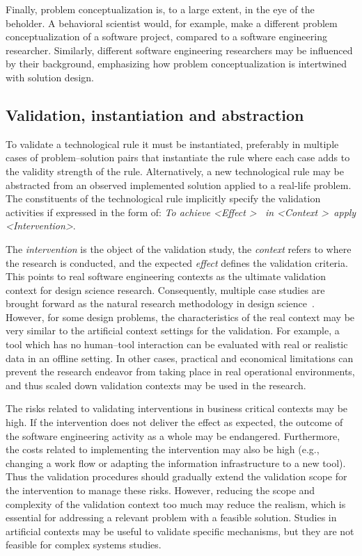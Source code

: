 \documentclass[graybox]{svmult}
\begin{document}
Finally, problem conceptualization is, to a large extent, in the eye of the beholder. A behavioral scientist would, for example, make a different problem conceptualization of a software project, compared to a software engineering researcher. Similarly, different software engineering researchers may be influenced by their background, emphasizing how problem conceptualization is intertwined with solution design.

 

\subsection{Validation, instantiation and abstraction}

To validate a technological rule it must be instantiated, preferably in multiple cases of problem--solution pairs that instantiate the rule where each case adds to the validity strength of the rule. Alternatively, a new technological rule may be abstracted from an observed implemented solution applied to a real-life problem.
The constituents of the technological rule implicitly specify the validation activities if expressed in the form of:
{\emph{To achieve \textless Effect \textgreater ~ in \textless Context \textgreater~apply \textless Intervention\textgreater}.} 

The \emph{intervention} is the object of the validation study, the \emph{context}  refers to where the research is conducted, and the expected \emph{effect} defines the validation criteria. This points to real software engineering contexts as the ultimate validation context for design science research. 
Consequently, multiple case studies are brought forward as the natural research methodology in design science~\citep{van_aken_management_2004}. However, for some design problems, the characteristics of the real context may be very similar to the artificial context settings for the validation. For example, a tool which has no human--tool interaction can be evaluated with real or realistic data in an offline setting. In other cases, practical and economical limitations can prevent the research endeavor from taking place in real operational environments, and thus scaled down validation contexts may be used in the research. 

The risks related to validating interventions in business critical contexts may be high. If the intervention does not deliver the effect as expected, the outcome of the software engineering activity as a whole may be endangered. Furthermore, the costs related to implementing the intervention may also be high (e.g., changing a work flow or adapting the information infrastructure to a new tool). Thus the validation procedures should gradually extend the validation scope for the intervention to manage these risks.
However, reducing the scope and complexity of the validation context too much may reduce the realism, which is essential for addressing a relevant problem with a feasible solution. Studies in artificial contexts may be useful to validate specific mechanisms, but they are not feasible for complex systems studies.  
\end{document}
